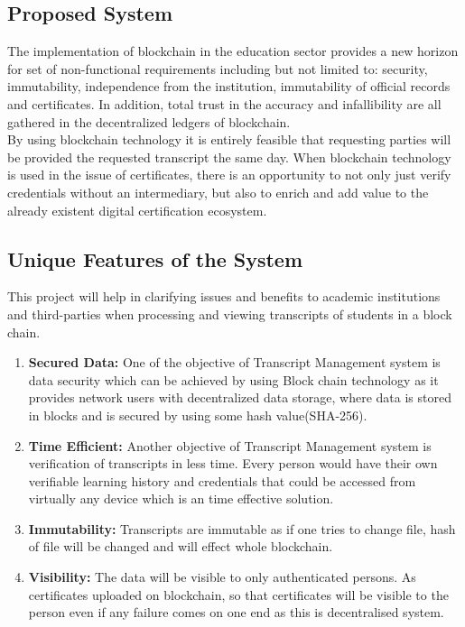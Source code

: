 \subsection{Proposed System}
The implementation of blockchain in the education sector provides a new horizon for set of non-functional requirements including but not limited to: security, immutability, independence from the institution, immutability of official records and certificates. In addition, total trust in the accuracy and infallibility are all gathered in the decentralized ledgers of blockchain. \\
\noindent
By using blockchain technology it is entirely feasible that requesting parties will be provided the requested transcript the same day. When blockchain technology is used in the issue of certificates, there is an opportunity to not only just verify credentials without an intermediary, but also to enrich and add value to the already existent digital certification ecosystem.


\subsection{Unique Features of the System}
This project will help in clarifying issues and benefits to academic institutions and third-parties when processing and viewing transcripts of students in a block chain. 

\begin{enumerate}
    \item \textbf{Secured Data:} One of the objective of Transcript Management system is data security which can be achieved by using Block chain technology as it provides network users with decentralized data storage, where data is stored in blocks and is secured by using some hash value(SHA-256).
    \item \textbf{Time Efficient:} Another objective of Transcript Management system is verification of transcripts in less time. Every person would have their own verifiable learning history and credentials that could be accessed from virtually any device which is an time effective solution.
    \item \textbf{Immutability:} Transcripts are immutable as if one tries to change file, hash of file will be changed and will effect whole blockchain.
    \item \textbf{Visibility:} The data will be visible to only authenticated persons. As certificates uploaded on blockchain, so that certificates will be visible to the person even if any failure comes on one end as this is decentralised system.
\end{enumerate}

